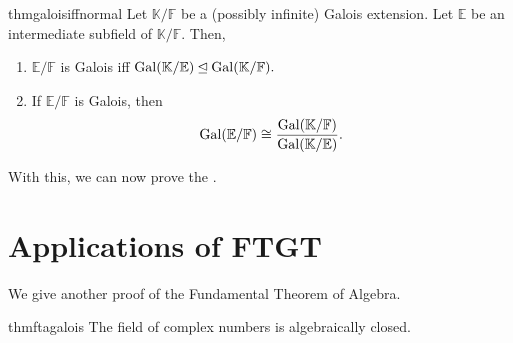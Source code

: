 \begin{restatable}[]{thm}{galoisiffnormal}
\label{thm:galoisiffnormal}
    Let $\mathbb{K}/\mathbb{F}$ be a {\color{purple}(possibly infinite)} Galois extension. Let $\mathbb{E}$ be an intermediate subfield of $\mathbb{K}/\mathbb{F}.$ Then,
    \begin{enumerate}
        \item $\mathbb{E}/\mathbb{F}$ is Galois iff $\operatorname{Gal}(\mathbb{K}/\mathbb{E}) \unlhd \operatorname{Gal}(\mathbb{K}/\mathbb{F}).$
        \item If $\mathbb{E}/\mathbb{F}$ is Galois, then
        \begin{equation*} 
             \operatorname{Gal}(\mathbb{E}/\mathbb{F}) \cong \frac{\operatorname{Gal}(\mathbb{K}/\mathbb{F})}{\operatorname{Gal}(\mathbb{K}/\mathbb{E})}.
        \end{equation*}
        \hfill\hyperref[thm:galoisiffnormal2]{\downsym}
     \end{enumerate} 
\end{restatable}

With this, we can now prove the . \hfill\hyperref[thm:FTGT2]{\downsym}


\section{Applications of FTGT}
We give another proof of the Fundamental Theorem of Algebra.

\begin{restatable}{thm}{ftagalois}
\label{thm:ftagalois}
    The field of complex numbers is algebraically closed. \hfill\hyperref[thm:ftagalois2]{\downsym}
\end{restatable}

